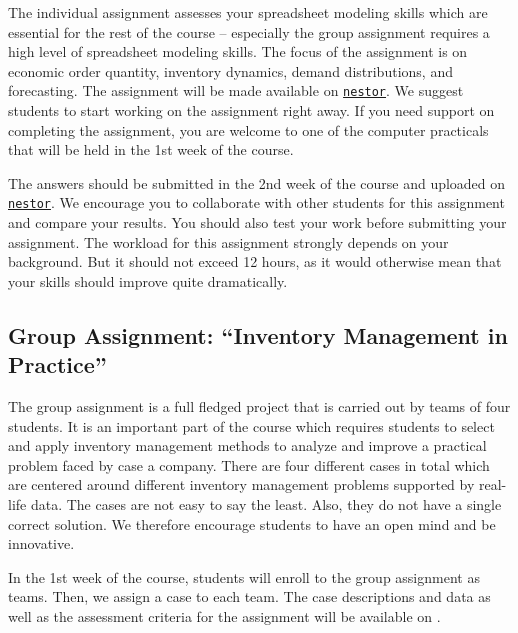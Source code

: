 \documentclass{article}
\begin{document}
The individual assignment assesses your spreadsheet modeling skills which are essential for the rest of the course -- especially the group assignment requires a high level of spreadsheet modeling skills. The focus of the assignment is on economic order quantity, inventory dynamics, demand distributions, and forecasting. The assignment will be made available on \href{nestor.rug.nl}{\texttt{nestor}}. We suggest students to start working on the assignment right away. If you need support on completing the assignment, you are welcome to one of the computer practicals that will be held in the 1st week of the course. 

The answers should be submitted in the 2nd week of the course and uploaded on \href{nestor.rug.nl}{\texttt{nestor}}. We encourage you to collaborate with other students for this assignment and compare your results. You should also test your work before submitting your assignment. The workload for this assignment strongly depends on your background. But it should not exceed 12 hours, as it would otherwise mean that your skills should improve quite dramatically. 

\subsection{Group Assignment: ``Inventory Management in Practice''}
\label{sec:group}

The group assignment is a full fledged project that is carried out by teams of four students. It is an important part of the course which requires students to select and apply inventory management methods to analyze and improve a practical problem faced by case a company. There are four different cases in total which are centered around different inventory management problems supported by real-life data. The cases are not easy to say the least. Also, they do not have a single correct solution. We therefore encourage students to have an open mind and be innovative. 

In the 1st week of the course, students will enroll to the group assignment as teams. Then, we assign a case to each team. The case descriptions and data as well as the assessment criteria for the assignment will be available on \nestor.
\end{document}
